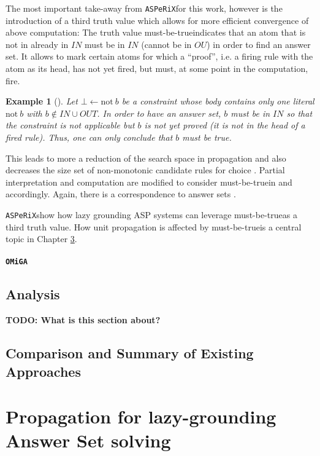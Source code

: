 \documentclass{vutinfth} %
\newcommand{\todo}[1]{{\color{red}\textbf{TODO: {#1}}}} %
\newtheorem{example}{Example}[section]
\newcommand{\mbt}{must-be-true}
\newcommand{\fail}{\mathrm{not } \ \xspace}
\newcommand{\from}{\ensuremath{\leftarrow}}
\newcommand{\asperix}{{\texttt{ASPeRiX}\xspace}}
\newcommand{\omiga}{\texttt{OMiGA}\xspace}
\begin{document}
The most important take-away from \asperix for this work, however is the introduction of a third truth value which allows for more efficient convergence of above computation: The truth value \mbt indicates that an atom that is not in already in $IN$ must be in $IN$ (cannot be in $OU$) in order to find an answer set. It allows to mark certain atoms for which a \enquote{proof}, i.e. a firing rule with the atom as its head, has not yet fired, but must, at some point in the computation, fire.

\begin{example}[{\cite[Example 7]{asperix}}]
Let $\bot \from \fail b$ be a constraint whose body contains only one literal $\fail b$ with $b \not \in IN \cup OUT$. In order to have an answer set, $b$ must be in $IN$ so that the constraint is not applicable but $b$ is not yet proved (it is not in the head of a fired rule). Thus, one can only conclude that $b$ must be true.
\end{example}

This leads to more a reduction of the search space in propagation \cite[Ex.~8]{asperix} and also decreases the size set of non-monotonic candidate rules for choice \cite[Ex.~9]{asperix}. Partial interpretation and computation are modified to consider \mbt in \cite[Def.~8]{asperix} and \cite[Def.~11]{asperix} accordingly. Again, there is a correspondence to answer sets \cite[Thm.~3]{asperix}.

\asperix show how lazy grounding ASP systems can leverage \mbt as a third truth value. How unit propagation is affected by \mbt is a central topic in Chapter \ref{chap:prop}.

\subsubsection{\texttt{\omiga}}

\section{Analysis}
\todo{What is this section about?}

\section{Comparison and Summary of Existing Approaches}

\chapter{Propagation for lazy-grounding Answer Set solving}
\label{chap:prop}
\end{document}
